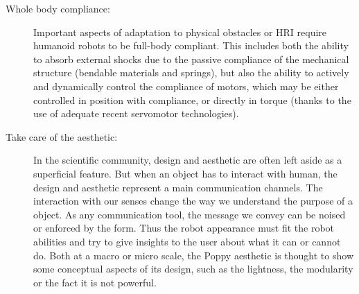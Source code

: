 \begin{description}
    \item[Whole body compliance:] Important aspects of adaptation to physical obstacles or HRI require humanoid robots to be full-body compliant. This includes both the ability to absorb external shocks due to the passive compliance of the mechanical structure (bendable materials and springs), but also the ability to actively and dynamically control the compliance of motors, which may be either controlled in position with compliance, or directly in torque (thanks to the use of adequate recent servomotor technologies).

    \item[Take care of the aesthetic:] In the scientific community, design and aesthetic are often left aside as a superficial feature. But when an object has to interact with human, the design and aesthetic represent a main communication channels. The interaction with our senses change the way we understand the purpose of a object. As any communication tool, the message we convey can be noised or enforced by the form. Thus the robot appearance must fit the robot abilities and try to give insights to the user about what it can or cannot do.
    Both at a macro or micro scale, the Poppy aesthetic is thought to show some conceptual aspects of its design, such as the lightness, the modularity or the fact it is not powerful.

\end{description}



